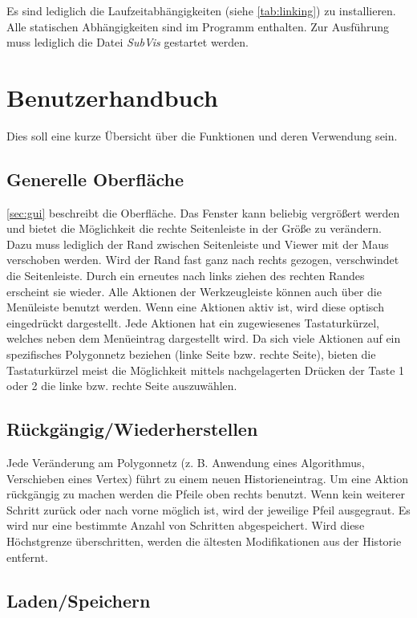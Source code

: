 Es sind lediglich die Laufzeitabhängigkeiten (siehe \autoref{tab:linking}) zu installieren. 
Alle statischen Abhängigkeiten sind im Programm enthalten.
Zur Ausführung muss lediglich die Datei \emph{SubVis} gestartet werden.

\section{Benutzerhandbuch}

Dies soll eine kurze Übersicht über die Funktionen und deren Verwendung sein.

\subsection{Generelle Oberfläche}

\autoref{sec:gui} beschreibt die Oberfläche. 
Das Fenster kann beliebig vergrößert werden und bietet die Möglichkeit die rechte Seitenleiste in der Größe zu verändern. 
Dazu muss lediglich der Rand zwischen Seitenleiste und Viewer mit der Maus verschoben werden.
Wird der Rand fast ganz nach rechts gezogen, verschwindet die Seitenleiste.
Durch ein erneutes nach links ziehen des rechten Randes erscheint sie wieder.
Alle Aktionen der Werkzeugleiste können auch über die Menüleiste benutzt werden.
Wenn eine Aktionen aktiv ist, wird diese optisch eingedrückt dargestellt.
Jede Aktionen hat ein zugewiesenes Tastaturkürzel, welches neben dem Menüeintrag dargestellt wird.
Da sich viele Aktionen auf ein spezifisches Polygonnetz beziehen (linke Seite bzw. rechte Seite), bieten die Tastaturkürzel meist die Möglichkeit mittels nachgelagerten Drücken der Taste 1 oder 2 die linke bzw. rechte Seite auszuwählen.

\subsection{Rückgängig/Wiederherstellen}

Jede Veränderung am Polygonnetz (z. B. Anwendung eines Algorithmus, Verschieben eines Vertex) führt zu einem neuen Historieneintrag. 
Um eine Aktion rückgängig zu machen werden die Pfeile oben rechts benutzt.
Wenn kein weiterer Schritt zurück oder nach vorne möglich ist, wird der jeweilige Pfeil ausgegraut.
Es wird nur eine bestimmte Anzahl von Schritten abgespeichert.
Wird diese Höchstgrenze überschritten, werden die ältesten Modifikationen aus der Historie entfernt.

\subsection{Laden/Speichern}

